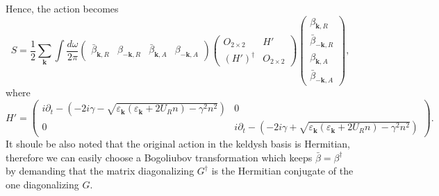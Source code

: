 \documentclass[aps,onecolumn,superscriptaddress,notitlepage,longbibliography]{revtex4-1}
\newcommand{\tmmathbf}[1]{\ensuremath{\boldsymbol{#1}}}
\begin{document}
Hence, the action becomes
\begin{equation}
  S = \frac{1}{2} \sum_{\tmmathbf{k}} \int \frac{d \omega}{2 \pi}
  \left(\begin{array}{cccc}
    \bar{\beta}_{\tmmathbf{k}, R} & \beta_{- \tmmathbf{k}, R} &
    \bar{\beta}_{\tmmathbf{k}, A} & \beta_{- \tmmathbf{k}, A}
  \end{array}\right) \left(\begin{array}{cc}
    O_{2 \times 2} & H'\\
    (H')^{\dagger} & O_{2 \times 2}
  \end{array}\right) \left(\begin{array}{c}
    \beta_{\tmmathbf{k}, R}\\
    \bar{\beta}_{- \tmmathbf{k}, R}\\
    \beta_{\tmmathbf{k}, A}\\
    \bar{\beta}_{- \tmmathbf{k}, A}
  \end{array}\right),
\end{equation}
where
\begin{equation}
  H' = \left(\begin{array}{cc}
    i \partial_t - \left( - 2 i \gamma - \sqrt{\varepsilon_{\tmmathbf{k}}
    (\varepsilon_{\tmmathbf{k}} + 2 U_R n) - \gamma^2 n^2} \right) & 0\\
    0 & i \partial_t - \left( - 2 i \gamma + \sqrt{\varepsilon_{\tmmathbf{k}}
    (\varepsilon_{\tmmathbf{k}} + 2 U_R n) - \gamma^2 n^2} \right)
  \end{array}\right) .
\end{equation}
It shoule be also noted that the original action in the keldysh basis is Hermitian, therefore we can easily choose a Bogoliubov transformation which keeps $\bar{\beta}=\beta^\dagger$ by demanding that the matrix diagonalizing $G^\dagger$ is the Hermitian conjugate of the one diagonalizing $G$. 

\
\end{document}
